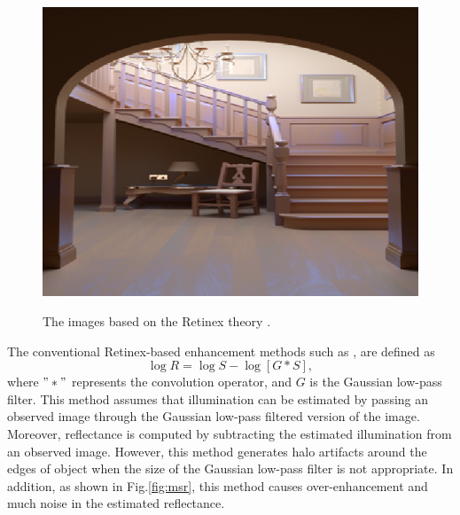 \begin{figure}[tb]
\begin{minipage}[b]{0.32\hsize}
		\includegraphics[height=0.75\hsize]{images/retinex/illumination.eps}
		 \label{fig:retinex/illumination}
	\end{minipage}
\caption{The images based on the Retinex theory \cite{arpr}.}
\label{fig:retinex}
\end{figure}
The conventional Retinex-based enhancement methods such as \cite{ssr}, \cite{msr} are defined as
\begin{equation}
\log{R} = \log{S} - \log{[G \ast S]}, \label{eq:log_retinex}
\end{equation}
where $"\ast"$ represents the convolution operator, and $G$ is the Gaussian low-pass filter. This method assumes that illumination can be estimated by passing an observed image through the Gaussian low-pass filtered version of the image. Moreover, reflectance is computed by subtracting the estimated illumination from an observed image. However, this method generates halo artifacts around the edges of object when the size of the Gaussian low-pass filter is not appropriate. In addition, as shown in Fig.\ref{fig:msr}, this method causes over-enhancement and much noise in the estimated reflectance. 
